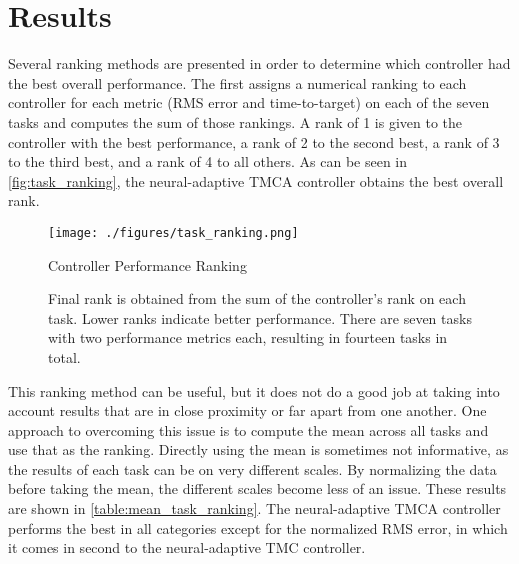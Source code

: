 \documentclass[letterpaper,12pt,titlepage,oneside,final]{book}
\begin{document}
\section{Results}


Several ranking methods are presented in order to determine which controller had the best overall performance.
The first assigns a numerical ranking to each controller for each metric (RMS error and time-to-target) on each of the seven tasks and computes the sum of those rankings.
A rank of 1 is given to the controller with the best performance, a rank of 2 to the second best, a rank of 3 to the third best, and a rank of 4 to all others.
As can be seen in \autoref{fig:task_ranking}, the neural-adaptive TMCA controller obtains the best overall rank.

\begin{figure}
\centering
\texttt{[image: ./figures/task\_ranking.png]}

\caption{Controller Performance Ranking}
\label{fig:task_ranking}
\captionsetup{singlelinecheck=off,font=footnotesize}
\caption*{Final rank is obtained from the sum of the controller's rank on each task. Lower ranks indicate better performance. There are seven tasks with two performance metrics each, resulting in fourteen tasks in total.}
\end{figure}

This ranking method can be useful, but it does not do a good job at taking into account results that are in close proximity or far apart from one another.
One approach to overcoming this issue is to compute the mean across all tasks and use that as the ranking.
Directly using the mean is sometimes not informative, as the results of each task can be on very different scales.
By normalizing the data before taking the mean, the different scales become less of an issue.
These results are shown in \autoref{table:mean_task_ranking}.
The neural-adaptive TMCA controller performs the best in all categories except for the normalized RMS error, in which it comes in second to the neural-adaptive TMC controller.
\end{document}
